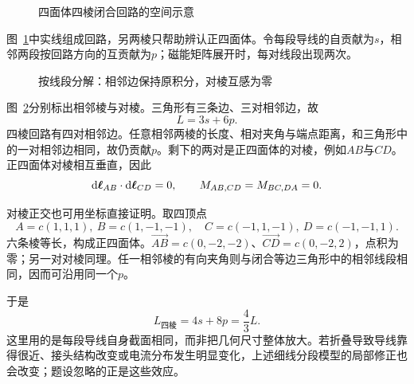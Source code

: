 \begin{figure}[H]\centering
{}
\caption{四面体四棱闭合回路的空间示意}\label{fig:i3-e5-q}
\end{figure}
\begin{solution}
图~\ref{fig:i3-e5-q}中实线组成回路，另两棱只帮助辨认正四面体。令每段导线的自贡献为$s$，相邻两段按回路方向的互贡献为$p$；磁能矩阵展开时，每对线段出现两次。


\begin{figure}[H]\centering
{}
\caption{按线段分解：相邻边保持原积分，对棱互感为零}\label{fig:i3-e5-s}
\end{figure}

图~\ref{fig:i3-e5-s}分别标出相邻棱与对棱。三角形有三条边、三对相邻边，故
\[
L=3s+6p.
\]
四棱回路有四对相邻边。任意相邻两棱的长度、相对夹角与端点距离，和三角形中的一对相邻边相同，故仍贡献$p$。剩下的两对是正四面体的对棱，例如$AB$与$CD$。正四面体对棱相互垂直，因此
\[
\mathop{}\!\mathrm d\bm{\ell}_{AB}\cdot\mathop{}\!\mathrm d\bm{\ell}_{CD}=0,\qquad
M_{AB,CD}=M_{BC,DA}=0.
\]

对棱正交也可用坐标直接证明。取四顶点
\[
A=c(1,1,1),\ B=c(1,-1,-1),\quad
C=c(-1,1,-1),\ D=c(-1,-1,1).
\]
六条棱等长，构成正四面体。$\overrightarrow{AB}=c(0,-2,-2)$、$\overrightarrow{CD}=c(0,-2,2)$，点积为零；另一对对棱同理。任一相邻棱的有向夹角则与闭合等边三角形中的相邻线段相同，因而可沿用同一个$p$。


于是
\[
L_{\text{四棱}}=4s+8p=\boxed{\frac43L}.
\]
这里用的是每段导线自身截面相同，而非把几何尺寸整体放大。若折叠导致导线靠得很近、接头结构改变或电流分布发生明显变化，上述细线分段模型的局部修正也会改变；题设忽略的正是这些效应。
\end{solution}

